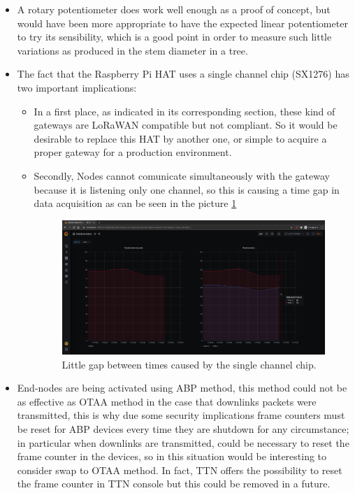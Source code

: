 \documentclass[11pt,a4paper,dvipsnames,twoside]{article}
\begin{document}
\begin{itemize}
  \item A rotary potentiometer does work well enough as a proof of concept, but would have been more appropriate to have the expected linear potentiometer to try its sensibility, which is a good point in order to measure such little variations as produced in the stem diameter in a tree.
  \item The fact that the Raspberry Pi HAT uses a single channel chip (SX1276) has two important implications:
    \begin{itemize}
      \item In a first place, as indicated in its corresponding section, these kind of gateways are LoRaWAN compatible but not compliant. So it would be desirable to replace this HAT by another one, or simple to acquire a proper gateway for a production environment.
      \item Secondly, Nodes cannot comunicate simultaneously with the gateway because it is listening only one channel, so this is causing a time gap in data acquisition as can be seen in the picture \ref{fig:times_gap}
      \begin{figure}[ht]
        \centering
        \includegraphics[width=.9\textwidth]{../pictures/Grafana_times_gap.png}
        \caption{Little gap between times caused by the single channel chip.}
        \label{fig:times_gap}
      \end{figure}
    \end{itemize}
    \item End-nodes are being activated using ABP method, this method could not be as effective as OTAA method in the case that downlinks packets were transmitted, this is why due some security implications frame counters must be reset for ABP devices every time they are shutdown for any circumstance; in particular when downlinks are transmitted, could be necessary to reset the frame counter in the devices, so in this situation would be interesting to consider swap to OTAA method. In fact, TTN offers the possibility to reset the frame counter in TTN console but this could be removed in a future.

\end{itemize}
\end{document}

